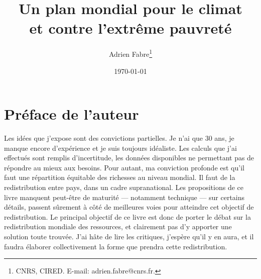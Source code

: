 \documentclass[a5paper,french]{memoir}
\title{Un plan mondial pour le climat \\et contre l'extrême pauvreté}
\author{Adrien Fabre\footnote{CNRS, CIRED. E-mail: adrien.fabre@cnrs.fr.}}
\date{\today}
\begin{document}
\maketitle

\clearpage
\tableofcontents

\chapter*{Préface de l'auteur}\label{ch:preface}

Les idées que j'expose sont des convictions partielles. Je n'ai que 30 ans, je manque encore d'expérience et je suis toujours idéaliste. Les calculs que j'ai effectués sont remplis d'incertitude, les données disponibles ne permettant pas de répondre au mieux aux besoins. Pour autant, ma conviction profonde est qu'il faut une répartition équitable des richesses au niveau mondial. Il faut de la redistribution entre pays, dans un cadre supranational. Les propositions de ce livre manquent peut-être de maturité --- notamment technique --- sur certains détails, passent sûrement à côté de meilleures voies pour atteindre cet objectif de redistribution. Le principal objectif de ce livre est donc de porter le débat sur la redistribution mondiale des ressources, et clairement pas d'y apporter une solution toute trouvée. J'ai hâte de lire les critiques, j'espère qu'il y en aura, et il faudra élaborer collectivement la forme que prendra cette redistribution. 
\end{document}
